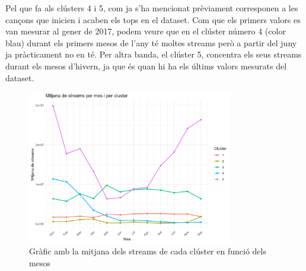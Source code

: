 \documentclass{article}
\begin{document}
Pel que fa als clústers 4 i 5, com ja s'ha mencionat prèviament corresponen a les cançons que inicien i acaben els tops en el dataset. Com que els primers valors es van mesurar al gener de 2017, podem veure que en el clúster número 4 (color blau) durant els primers mesos de l'any té moltes streams però a partir del juny ja pràcticament no en té. Per altra banda, el clúster 5, concentra els seus streams durant els mesos d'hivern, ja que és quan hi ha els últims valors mesurats del dataset.

\begin{figure}[H]
    \centering
    \includegraphics[width=0.8\textwidth]{Images/4_clustering/time_series/evol_streams_per_mes_i_cluster.png}
    \caption{Gràfic amb la mitjana dels streams de cada clúster en funció dels mesos}
    \label{fig:TS_evol_streams_per_mes_i_cluster}
\end{figure}
\end{document}

